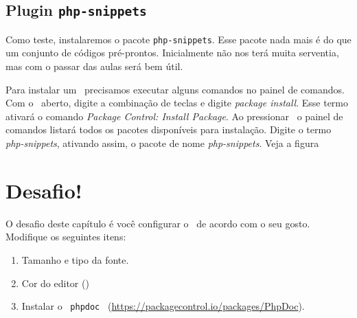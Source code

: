 \subsection{Plugin \texttt{php-snippets}}
\label{plugin-php-snippets}

Como teste, instalaremos o pacote \texttt{php-snippets}. Esse
pacote nada mais é do que um conjunto de códigos pré-prontos. Inicialmente não
nos terá muita serventia, mas com o passar das aulas será bem útil.

Para instalar um \plugin~precisamos executar alguns comandos no painel de comandos.
Com o \sublime~aberto, digite a combinação de teclas \ctrlshiftp e digite
\textit{package install}. Esse termo ativará o comando \textit{Package Control: Install Package}.
Ao pressionar \avancar~o painel de comandos listará todos os pacotes disponíveis
para instalação. Digite o termo \textit{php-snippets}, ativando assim, o pacote
de nome \textit{php-snippets}. Veja a figura


\section{Desafio!}
\label{cap2-desafio}
O desafio deste capítulo é você configurar o \sublime~de acordo com o seu gosto.
Modifique os seguintes itens:
\begin{enumerate}
  \item Tamanho e tipo da fonte.
  \item Cor do editor ()
  \item Instalar o \plugin~\texttt{phpdoc}~ (\url{https://packagecontrol.io/packages/PhpDoc}).
\end{enumerate}
